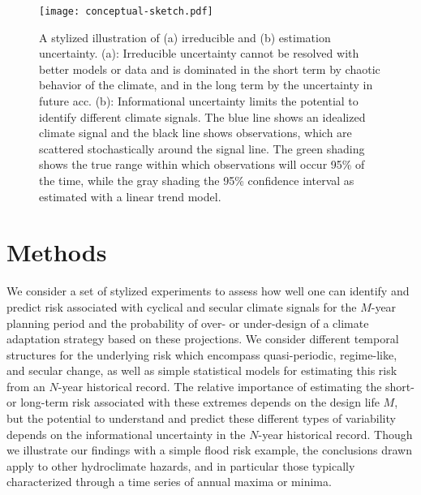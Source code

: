 \documentclass[
  draft,
  linenumbers
]{agujournal2019}
\begin{document}
\begin{figure}
  \centering
  \texttt{[image: conceptual-sketch.pdf]}
  \caption{
    A stylized illustration of (a) irreducible and (b) estimation uncertainty.
    (a): Irreducible uncertainty cannot be resolved with better models or data and is dominated in the short term by chaotic behavior of the climate, and in the long term by the uncertainty in future \acrlong{acc}.
    (b): Informational uncertainty limits the potential to identify different climate signals.
    The blue line shows an idealized climate signal and the black line shows observations, which are scattered stochastically around the signal line.
    The green shading shows the true range within which observations will occur 95\% of the time, while the gray shading the 95\% confidence interval as estimated with a linear trend model.
    }\label{fig:conceptual-sketch}
\end{figure}


\section{Methods}\label{sec:methods}

We consider a set of stylized experiments to assess how well one can identify and predict risk associated with cyclical and secular climate signals for the $M$-year planning period and the probability of over- or under-design of a climate adaptation strategy based on these projections.
We consider different temporal structures for the underlying risk which encompass quasi-periodic, regime-like, and secular change, as well as simple statistical models for estimating this risk from an $N$-year historical record.
The relative importance of estimating the short- or long-term risk associated with these extremes depends on the design life $M$, but the potential to understand and predict these different types of variability depends on the informational uncertainty in the $N$-year historical record.
Though we illustrate our findings with a simple flood risk example, the conclusions drawn apply to other hydroclimate hazards, and in particular those typically characterized through a time series of annual maxima or minima.
\end{document}
